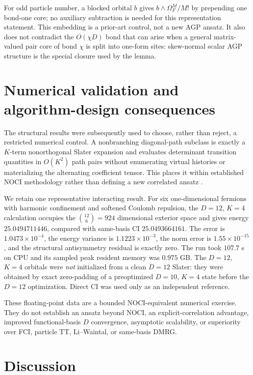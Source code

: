 \documentclass[aps,pra,reprint,superscriptaddress,nofootinbib,longbibliography,showkeys]{revtex4-2}
\theoremstyle{definition}
\begin{document}
For odd particle number, a blocked orbital $b$ gives
$b\wedge\Omega_F^M/M!$ by prepending one bond-one core; no auxiliary
subtraction is needed for this representation statement.  This embedding is
a prior-art control, not a new AGP ansatz.  It also does not contradict the
$O(\chi D)$ bond that can arise when a general matrix-valued pair core of bond
$\chi$ is split into one-form sites: skew-normal scalar AGP structure is the
special closure used by the lemma.

\section{Numerical validation and algorithm-design consequences}

The structural results were subsequently used to choose, rather than reject,
a restricted numerical control.  A nonbranching diagonal-path subclass is
exactly a $K$-term nonorthogonal Slater expansion and evaluates determinant
transition quantities in $O(K^2)$ path pairs without enumerating virtual
histories or materializing the alternating coefficient tensor.  This places it
within established NOCI methodology rather than defining a new correlated
ansatz \cite{ThomHeadGordon2009NOCI,BeylkinMohlenkampPerez2008SlaterSums}.

We retain one representative interacting result.  For six one-dimensional
fermions with harmonic confinement and softened Coulomb repulsion, the
$D=12$, $K=4$ calculation occupies the $\binom{12}{6}=924$ dimensional exterior
space and gives energy $25.0494711446$, compared with same-basis CI
$25.0493664161$.  The error is $1.0473\times10^{-4}$, the energy variance is
$1.1223\times10^{-3}$, the norm error is $1.55\times10^{-15}$, and the
structural antisymmetry residual is exactly zero.  The run took $107.7$ s on
CPU and its sampled peak resident memory was $0.975$ GB.  The $D=12$, $K=4$
orbitals were \emph{not} initialized from a clean $D=12$ Slater: they were
obtained by exact zero-padding of a preoptimized $D=10$, $K=4$ state before the
$D=12$ optimization.  Direct CI was used only as an independent reference.

These floating-point data are a bounded NOCI-equivalent numerical exercise.
They do not establish an ansatz beyond NOCI, an explicit-correlation advantage,
improved functional-basis $D$ convergence, asymptotic scalability, or
superiority over FCI, particle TT, Li--Waintal, or same-basis DMRG.

\section{Discussion}
\end{document}
